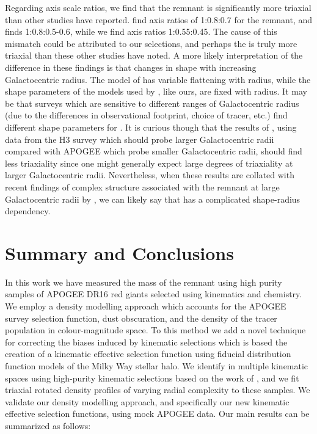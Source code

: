 Regarding axis scale ratios, we find that the \gse remnant is significantly more triaxial than other studies have reported. \textcite{han22} find axis ratios of 1:0.8:0.7 for the \gse remnant, and \textcite{iorio18} finds 1:0.8:0.5-0.6, while we find axis ratios 1:0.55:0.45. The cause of this mismatch could be attributed to our selections, and perhaps the \gse is truly more triaxial than these other studies have noted. A more likely interpretation of the difference in these findings is that \gse changes in shape with increasing Galactocentric radius. The model of \textcite{iorio18} has variable flattening with radius, while the shape parameters of the models used by \textcite{han22}, like ours, are fixed with radius. It may be that surveys which are sensitive to different ranges of Galactocentric radius (due to the differences in observational footprint, choice of tracer, etc.) find different shape parameters for \gse. It is curious though that the results of \textcite{han22}, using data from the H3 survey which should probe larger Galactocentric radii compared with APOGEE which probe smaller Galactocentric radii, should find less triaxiality since one might generally expect large degrees of triaxiality at larger Galactocentric radii. Nevertheless, when these results are collated with recent findings of complex structure associated with the \gse remnant at large Galactocentric radii by \textcite{chandra23}, we can likely say that \gse has a complicated shape-radius dependency.


\section{Summary and Conclusions}
\label{sec:summary-conclusions}

In this work we have measured the mass of the \gse remnant using high purity samples of APOGEE DR16 red giants selected using kinematics and chemistry. We employ a density modelling approach which accounts for the APOGEE survey selection function, dust obscuration, and the density of the tracer population in colour-magnitude space. To this method we add a novel technique for correcting the biases induced by kinematic selections which is based the creation of a kinematic effective selection function using fiducial distribution function models of the Milky Way stellar halo. We identify \gse in multiple kinematic spaces using high-purity kinematic selections based on the work of \cite{lane22}, and we fit triaxial rotated density profiles of varying radial complexity to these samples. We validate our density modelling approach, and specifically our new kinematic effective selection functions, using mock APOGEE data. Our main results can be summarized as follows:

